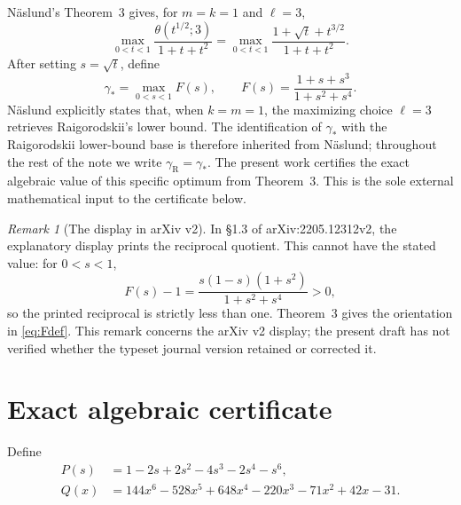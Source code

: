 \documentclass[11pt]{article}
\theoremstyle{remark}
\newtheorem{remark}[theorem]{Remark}
\newcommand{\gR}{\gamma_{\mathrm R}}
\begin{document}
N\"aslund's Theorem~3 gives, for \(m=k=1\) and \(\ell=3\),
\[
\max_{0<t<1}\frac{\theta(t^{1/2};3)}{1+t+t^2}
=\max_{0<t<1}\frac{1+\sqrt t+t^{3/2}}{1+t+t^2}.
\]
After setting \(s=\sqrt t\), define
\begin{equation}\label{eq:Fdef}
\gamma_*=\max_{0<s<1}F(s),
\qquad
F(s)=\frac{1+s+s^3}{1+s^2+s^4}.
\end{equation}
N\"aslund explicitly states that, when \(k=m=1\), the maximizing choice \(\ell=3\) retrieves Raigorodskii's lower bound. The identification of \(\gamma_*\) with the Raigorodskii lower-bound base is therefore inherited from N\"aslund; throughout the rest of the note we write \(\gR=\gamma_*\). The present work certifies the exact algebraic value of this specific optimum from Theorem~3. This is the sole external mathematical input to the certificate below.

\begin{remark}[The display in arXiv v2]
In \S1.3 of arXiv:2205.12312v2, the explanatory display prints the reciprocal quotient. This cannot have the stated value: for \(0<s<1\),
\[
F(s)-1=\frac{s(1-s)(1+s^2)}{1+s^2+s^4}>0,
\]
so the printed reciprocal is strictly less than one. Theorem~3 gives the orientation in \eqref{eq:Fdef}. This remark concerns the arXiv v2 display; the present draft has not verified whether the typeset journal version retained or corrected it.
\end{remark}

\section{Exact algebraic certificate}
Define
\begin{align}
P(s)&=1-2s+2s^2-4s^3-2s^4-s^6,\label{eq:Pdef}\\
Q(x)&=144x^6-528x^5+648x^4-220x^3-71x^2+42x-31.\label{eq:Qdef}
\end{align}
\end{document}
